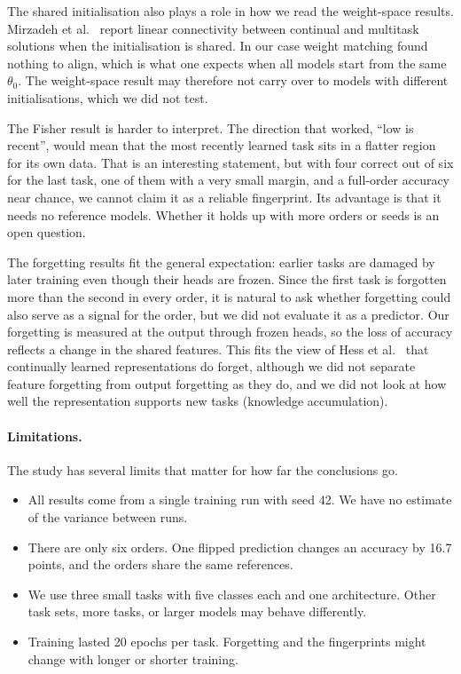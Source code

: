 \documentclass[11pt,a4paper]{article}
\begin{document}
The shared initialisation also plays a role in how we read the weight-space results. Mirzadeh et al.\ \cite{mirzadeh2020} report linear connectivity between continual and multitask solutions when the initialisation is shared. In our case weight matching found nothing to align, which is what one expects when all models start from the same $\theta_0$. The weight-space result may therefore not carry over to models with different initialisations, which we did not test.

The Fisher result is harder to interpret. The direction that worked, ``low is recent'', would mean that the most recently learned task sits in a flatter region for its own data. That is an interesting statement, but with four correct out of six for the last task, one of them with a very small margin, and a full-order accuracy near chance, we cannot claim it as a reliable fingerprint. Its advantage is that it needs no reference models. Whether it holds up with more orders or seeds is an open question.

The forgetting results fit the general expectation: earlier tasks are damaged by later training even though their heads are frozen. Since the first task is forgotten more than the second in every order, it is natural to ask whether forgetting could also serve as a signal for the order, but we did not evaluate it as a predictor. Our forgetting is measured at the output through frozen heads, so the loss of accuracy reflects a change in the shared features. This fits the view of Hess et al.\ \cite{hess2024} that continually learned representations do forget, although we did not separate feature forgetting from output forgetting as they do, and we did not look at how well the representation supports new tasks (knowledge accumulation).

\paragraph{Limitations.} The study has several limits that matter for how far the conclusions go.
\begin{itemize}
  \item All results come from a single training run with seed 42. We have no estimate of the variance between runs.
  \item There are only six orders. One flipped prediction changes an accuracy by 16.7 points, and the orders share the same references.
  \item We use three small tasks with five classes each and one architecture. Other task sets, more tasks, or larger models may behave differently.
  \item Training lasted 20 epochs per task. Forgetting and the fingerprints might change with longer or shorter training.
\end{itemize}
\end{document}
